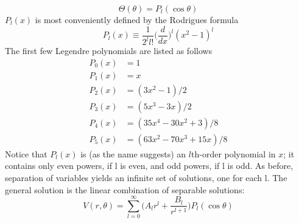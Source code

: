 \documentclass[../../../main.tex]{subfiles}
\begin{document}
\begin{equation*}
    \Theta(\theta)=P_l(\cos\theta)
\end{equation*}
$P_l (x)$ is most conveniently defined by the Rodrigues formula
\begin{equation*}
    P_l (x)\equiv \frac{1}{2^ll!}\biggl(\frac{d}{dx}\biggr)^l(x^2-1)^l
\end{equation*}
The first few Legendre polynomials are listed as follows
\begin{align*}
    P_0(x)&=1\\
    P_1(x)&=x\\
    P_2(x)&=(3x^2-1)/2\\
    P_3(x)&=(5x^3-3x)/2\\
    P_4(x)&=(35x^4-30x^2+3)/8\\
    P_5(x)&=(63x^2-70x^3+15x)/8
\end{align*}
Notice that $P_l (x)$ is (as the name suggests) an $l$th-order polynomial in $x$; it contains only even powers, if l is even, and odd powers, if l is odd. As before, separation of variables yields an infinite set of solutions, one for each l. The general solution is the linear combination of separable solutions:
\begin{equation*}
    V(r,\theta)=\sum_{l=0}^{\infty}\biggl(A_lr^l+\frac{B_l}{r^{l+1}}\biggr)P_l (\cos\theta)
\end{equation*}
\end{document}
